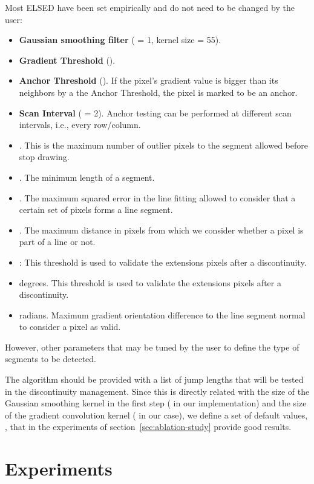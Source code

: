 \documentclass[preprint,12pt]{elsarticle}
\begin{document}
Most ELSED have been set empirically and do not need to be changed by the user:
\begin{itemize}
    \item \textbf{Gaussian smoothing filter} ( = 1, kernel size = 55).
    \item \textbf{Gradient Threshold} ().
    \item \textbf{Anchor Threshold} (). If the pixel's gradient value is bigger than its neighbors by a the Anchor Threshold, the pixel is marked to be an anchor.
    \item \textbf{Scan Interval} ( = 2). Anchor testing can be performed at different scan intervals, i.e., every row/column.
    \item . This is the maximum number of outlier pixels to the segment allowed before stop drawing.
    \item . The minimum length of a segment.
    \item . The maximum squared error in the line fitting allowed to consider that a certain set of pixels forms a line segment.
    \item . The maximum distance in pixels from which we consider whether a pixel is part of a line or not.
    \item : This threshold is used to validate the extensions pixels after a discontinuity.
    \item  degrees. This threshold is used to validate the extensions pixels after a discontinuity.
    \item  radians. Maximum gradient orientation difference to the line segment normal to consider a pixel as valid.
\end{itemize}

However, other parameters that may be tuned by the user to define the type of segments to be detected.

The algorithm should be provided with a list of jump lengths that will be tested in the discontinuity management. Since this is directly related with the size of the Gaussian smoothing kernel in the first step ( in our implementation) and the size of the gradient convolution kernel ( in our case), we define a set of default values, , that in the experiments of section~\ref{sec:ablation-study} provide good results. 

\section{Experiments} \label{sec:experiments}
\end{document}
